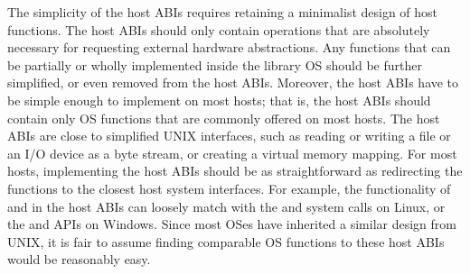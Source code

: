 The simplicity of the host ABIs requires retaining a minimalist design of host functions. %
The host ABIs should only contain operations that
are absolutely necessary for requesting external hardware abstractions.
Any functions that can be partially or wholly implemented inside the library OS
should be further simplified, or even removed from the host ABIs.
Moreover, the host ABIs have to be simple enough to implement on
most hosts;
that is, the host ABIs should contain only OS functions that are commonly offered on
most hosts.
The host ABIs are close to simplified UNIX interfaces,
such as reading or writing a file or an I/O device as a byte stream,
or creating a virtual memory mapping.
For most hosts,
implementing the host ABIs should be as straightforward as redirecting the functions to the closest host system interfaces.
For example, the functionality of  and  in the host ABIs can loosely match with
the  and  system calls on Linux,
or the  and  APIs on Windows.
Since most OSes have inherited a similar design from UNIX,
it is fair to assume finding
comparable OS functions %
to these host ABIs would be reasonably easy.

